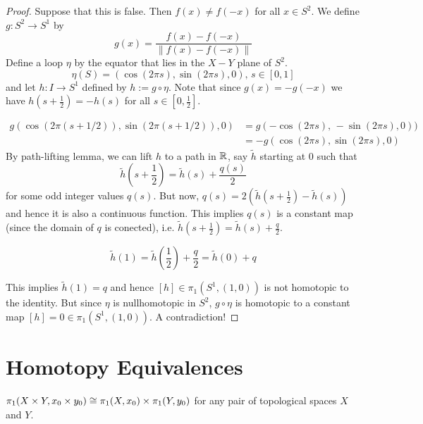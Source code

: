 \documentclass[12pt]{amsart}
\begin{document}
\begin{proof}
    Suppose that this is false. Then $f(x) \neq f(-x)$ for all $x \in S^2$. We define $g: S^2 \to S^1$ by 
    \[g(x) = \frac{f(x) - f(-x)}{\|f(x) - f(-x)\|}\]
    Define a loop $\eta$ by the equator that lies in the $X-Y$ plane of $S^2$. 
    \[\eta(S) = (\cos(2\pi s), \sin(2\pi s), 0), \, s \in [0,1]\]
    and let $h: I \to S^1$ defined by $h := g \circ \eta$. Note that since $g(x) = -g(-x)$ we have $h(s + \frac{1}{2})  = - h(s)$ for all $s \in \left[0, \frac{1}{2}\right]$. 

    \begin{align*}
        g(\cos(2\pi (s + 1/2)), \sin(2\pi (s + 1/2)), 0) &= g(-\cos(2 \pi s),\, - \sin (2 \pi s), 0)) \\ 
        &= -g(\cos(2 \pi s), \sin (2 \pi s), 0)
    \end{align*}
    By path-lifting lemma, we can lift $h$ to a path in $\mathbb R$, say $\widetilde{h}$ starting at $0$ such that 
    \[\widetilde{h} \left(s + \frac{1}{2}\right) = \widetilde{h}(s) + \frac{q(s)}{2}\]
    for some odd integer values $q(s)$. But now, ${q}(s) = 2(\widetilde{h}\left(s + \frac{1}{2}\right) - \widetilde{h}(s))$ and hence it is also a continuous function. This implies $q(s)$ is a constant map (since the domain of $q$ is conected), i.e. $\widetilde{h} \left(s + \frac{1}{2}\right) = \widetilde{h}(s) + \frac{q}{2}$. 

    \[\widetilde{h}(1) = \widetilde{h}\left(\frac{1}{2}\right) + \frac{q}{2} = \widetilde{h}(0) + q\]

    This implies $\widetilde{h}(1) =q$ and hence $[h] \in \pi_1(S^1, (1,0))$ is not homotopic to the identity. But since $\eta$ is nullhomotopic in $S^2$, $g \circ \eta$ is homotopic to a constant map $[h] = 0 \in \pi_1(S^1, (1,0))$. A contradiction! 
\end{proof}

\newpage 

\section{Homotopy Equivalences}

\begin{theorem}
    $\pi_1(X \times Y, x_0 \times y_0) \cong \pi_1(X, x_0) \times \pi_1(Y, y_0)$ for any pair of topological spaces $X$ and $Y$. 
\end{theorem}
\end{document}
